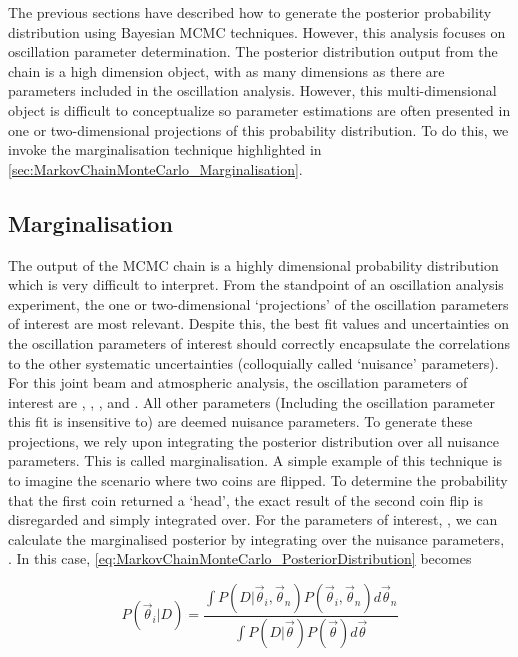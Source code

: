 The previous sections have described how to generate the posterior probability distribution using Bayesian MCMC techniques. However, this analysis focuses on oscillation parameter determination. The posterior distribution output from the chain is a high dimension object, with as many dimensions as there are parameters included in the oscillation analysis. However, this multi-dimensional object is difficult to conceptualize so parameter estimations are often presented in one or two-dimensional projections of this probability distribution. To do this, we invoke the marginalisation technique highlighted in \autoref{sec:MarkovChainMonteCarlo_Marginalisation}.

\subsection{Marginalisation}
\label{sec:MarkovChainMonteCarlo_Marginalisation}

The output of the MCMC chain is a highly dimensional probability distribution which is very difficult to interpret. From the standpoint of an oscillation analysis experiment, the one or two-dimensional `projections' of the oscillation parameters of interest are most relevant. Despite this, the best fit values and uncertainties on the oscillation parameters of interest should correctly encapsulate the correlations to the other systematic uncertainties (colloquially called `nuisance' parameters). For this joint beam and atmospheric analysis, the oscillation parameters of interest are \sinsqatm, \sinsqreac, \delmsqatm, and \dcp. All other parameters (Including the oscillation parameter this fit is insensitive to) are deemed nuisance parameters. To generate these projections, we rely upon integrating the posterior distribution over all nuisance parameters. This is called marginalisation. A simple example of this technique is to imagine the scenario where two coins are flipped. To determine the probability that the first coin returned a `head', the exact result of the second coin flip is disregarded and simply integrated over. For the parameters of interest, , we can calculate the marginalised posterior by integrating over the nuisance parameters, . In this case, \autoref{eq:MarkovChainMonteCarlo_PosteriorDistribution} becomes

\begin{equation}
P(\vec{\theta}_{i}|D) = \frac{\int P(D|\vec{\theta}_{i},\vec{\theta}_{n}) P(\vec{\theta}_{i},\vec{\theta}_{n}) d\vec{\theta}_{n}}{\int P(D|\vec{\theta}) P(\vec{\theta}) d\vec{\theta}}
\end{equation}

